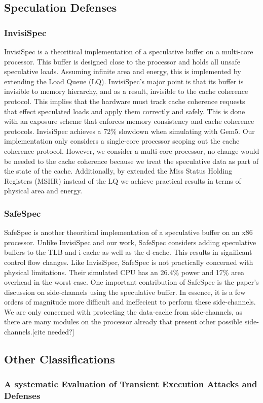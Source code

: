 \subsection{Speculation Defenses}
\subsubsection{InvisiSpec \cite{b46}}

InvisiSpec is a theoritical implementation of a speculative buffer on a multi-core
processor. This buffer is designed close to the processor and holds all unsafe speculative loads.
Assuming infinite area and energy, this is implemented by extending the Load Queue (LQ).
InvisiSpec's major point is that its buffer is invisible to memory hierarchy, and as a result,
invisible to the cache coherence protocol. This implies that the hardware must track cache
coherence requests that effect speculated loads and apply them correctly and safely. This is
done with an exposure scheme that enforces memory consistency and cache coherence protocols.
InvisiSpec achieves a 72\% slowdown when simulating with Gem5. Our implementation only
considers a single-core processor scoping out the cache coherence protocol. However, we consider
a multi-core processor, no change would be needed to the cache coherence because we treat the
speculative data as part of the state of the cache. Additionally, by extended the Miss
Status Holding Registers (MSHR) instead of the LQ we achieve practical results in terms
of physical area and energy.

\subsubsection{SafeSpec \cite{b29}}

SafeSpec is another theoritical implementation of a speculative buffer on an x86 processor.
Unlike InvisiSpec and our work, SafeSpec considers adding speculative buffers to the TLB and 
i-cache as well as the d-cache. This results in significant control flow changes.
Like InvisiSpec, SafeSpec is not practically concerned with physical limitations.
Their simulated CPU has an 26.4\% power and 17\% area overhead in the worst case. One
important contribution of SafeSpec is the paper's discussion on side-channels using the speculative
buffer. In essence, it is a few orders of magnitude more difficult and ineffecient to perform
these side-channels. We are only concerned with protecting the data-cache from side-channels, as
there are many modules on the processor already that present other possible side-channels.[cite needed?]

\subsection{Other Classifications}
\subsubsection{A systematic Evaluation of Transient Execution Attacks and Defenses \cite{b48}}
